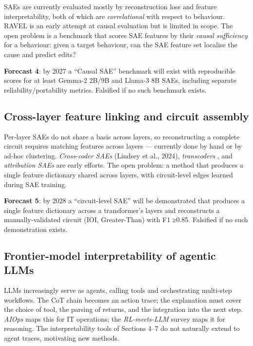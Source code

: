 \documentclass{article}
\begin{document}
SAEs are currently evaluated mostly by reconstruction loss and feature interpretability, both of which are \emph{correlational} with respect to behaviour. RAVEL \citep{huang2023asurveyonhallucina} is an early attempt at causal evaluation but is limited in scope. The open problem is a benchmark that scores SAE features by their \emph{causal sufficiency} for a behaviour: given a target behaviour, can the SAE feature set localise the cause and predict edits?

\textbf{Forecast 4}: by 2027 a ``Causal SAE'' benchmark will exist with reproducible scores for at least Gemma-2 2B/9B and Llama-3 8B SAEs, including separate reliability/portability metrics. Falsified if no such benchmark exists.

\subsection{Cross-layer feature linking and circuit assembly}\label{cross-layer-feature-linking-and-circuit-assembly}

Per-layer SAEs do not share a basis across layers, so reconstructing a complete circuit requires matching features across layers --- currently done by hand or by ad-hoc clustering. \emph{Cross-coder SAEs} (Lindsey et al., 2024), \emph{transcoders} \citep{dunefsky2025oneshotoptimizedst}, and \emph{attribution SAEs} are early efforts. The open problem: a method that produces a single feature dictionary shared across layers, with circuit-level edges learned during SAE training.

\textbf{Forecast 5}: by 2028 a ``circuit-level SAE'' will be demonstrated that produces a single feature dictionary across a transformer's layers and reconstructs a manually-validated circuit (IOI, Greater-Than) with F1 ≥0.85. Falsified if no such demonstration exists.

\subsection{Frontier-model interpretability of agentic LLMs}\label{frontier-model-interpretability-of-agentic-llms}

LLMs increasingly serve as agents, calling tools and orchestrating multi-step workflows. The CoT chain becomes an action trace; the explanation must cover the choice of tool, the parsing of returns, and the integration into the next step. \emph{AIOps} \citep{zhang2025jailbreakdistillat} maps this for IT operations; the \emph{RL-meets-LLM} survey \citep{liu2025reinforcementlearn} maps it for reasoning. The interpretability tools of Sections 4--7 do not naturally extend to agent traces, motivating new methods.
\end{document}
